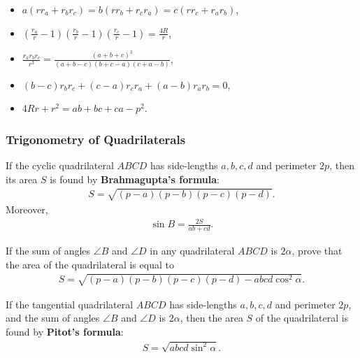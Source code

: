 \begin{tcolorbox}[title={More Identities on Triangle Radii}]
\begin{question}[name=Algebraic Identities on Radii]
\begin{itemize}
            \item $a(rr_a+r_br_c)=b(rr_b+r_cr_a)=c(rr_c+r_ar_b)$,
            \item $\displaystyle \left(\frac{r_a}{r}-1\right)\left(\frac{r_b}{r}-1\right)\left(\frac{r_c}{r}-1\right)=\frac{4R}{r}$,
            \item $\displaystyle \frac{r_ar_br_c}{r^3} = \frac{(a+b+c)^3}{(a+b-c)(b+c-a)(c+a-b)}$,
            \item $(b-c)r_br_c+(c-a)r_cr_a+(a-b)r_ar_b=0$,
            \item $4Rr+r^2=ab+bc+ca-p^2$. 
        \end{itemize}
    \end{question}
\end{tcolorbox}


\subsubsection{Trigonometry of Quadrilaterals}

\begin{tcolorbox}[title={Brahmagupta's (Generalized) Formula \& Pitot's Theorem}]
    \begin{question}[name={Brahmagupta's Formula on Area of Cyclic Quadrilaterals}]
    If the cyclic quadrilateral $ABCD$ has side-lengths $a,b,c,d$ and perimeter $2p$, then its area $S$ is found by \textbf{Brahmagupta’s formula}:
    \begin{align*}
        S = \sqrt{(p-a)(p-b)(p-c)(p-d)}.
    \end{align*}
    Moreover,
    \begin{align*}
        \sin B = \frac{2S}{ab+cd}.
    \end{align*}
    \end{question}

\begin{question}[name={Generalized Brahmagupta's Formula}]
    If the sum of angles $\angle B$ and $\angle D$ in any quadrilateral $ABCD$ is $2\alpha$, prove that the area of the quadrilateral is equal to
    \begin{align*}
        S = \sqrt{(p-a)(p-b)(p-c)(p-d)-abcd\cos^2\alpha}.
    \end{align*}
\end{question}

\begin{question}[name={Pitot's Theorem on Area of Tangential Quadrilaterals}]
    If the tangential quadrilateral $ABCD$ has side-lengths $a,b,c,d$ and perimeter $2p$, and the sum of angles $\angle B$ and $\angle D$ is $2\alpha$, then the area $S$ of the quadrilateral is found by \textbf{Pitot’s formula}:
    \begin{align*}
        S = \sqrt{abcd\sin^2\alpha}.
    \end{align*}
    \end{question}
\end{tcolorbox}




